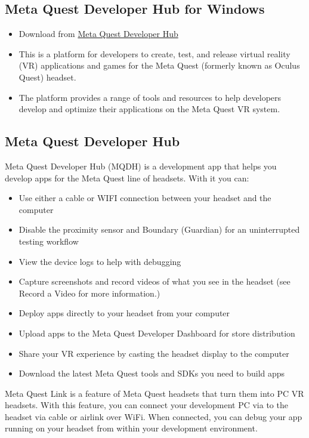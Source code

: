 \documentclass{article}
\begin{document}
\subsection{Meta Quest Developer Hub for Windows}

\begin{itemize}
    \item Download from \href{https://developer.oculus.com/downloads/package/oculus-developer-hub-win/}{Meta Quest Developer Hub}
    \item This is a platform for developers to create, test, and release virtual reality (VR) applications and games for the Meta Quest (formerly known as Oculus Quest) headset.
    \item The platform provides a range of tools and resources to help developers develop and optimize their applications on the Meta Quest VR system.
\end{itemize}

\subsection{Meta Quest Developer Hub}

Meta Quest Developer Hub (MQDH) is a development app that helps you develop apps for the Meta Quest line of headsets. With it you can:

\begin{itemize}
    \item Use either a cable or WIFI connection between your headset and the computer
    \item Disable the proximity sensor and Boundary (Guardian) for an uninterrupted testing workflow
    \item View the device logs to help with debugging
    \item Capture screenshots and record videos of what you see in the headset (see Record a Video for more information.)
    \item Deploy apps directly to your headset from your computer
    \item Upload apps to the Meta Quest Developer Dashboard for store distribution
    \item Share your VR experience by casting the headset display to the computer
    \item Download the latest Meta Quest tools and SDKs you need to build apps
\end{itemize}

Meta Quest Link is a feature of Meta Quest headsets that turn them into PC VR headsets. With this feature, you can connect your development PC via to the headset via cable or airlink over WiFi. When connected, you can debug your app running on your headset from within your development environment.
\end{document}
